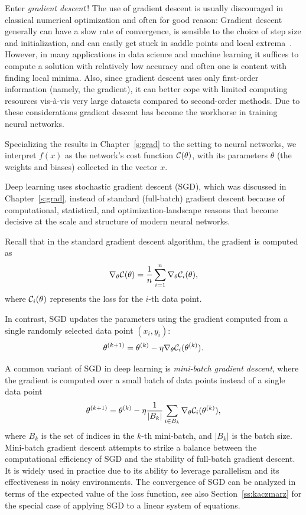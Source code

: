 Enter {\em gradient descent}\,!
The use of gradient descent is usually discouraged in classical numerical optimization and often for good reason: Gradient descent generally can have a slow rate of convergence, is sensible to the choice of step size and initialization, and can easily get stuck in saddle points and local extrema~\cite{nocedal2006numerical}. However, in many applications in data science and machine learning it suffices to compute a solution with relatively low accuracy and often one is content with finding local minima. Also, since gradient descent uses only first-order information (namely, the gradient), it can better cope with limited computing resources vis-{\`a}-vis very large datasets compared to second-order methods. Due to these considerations gradient descent has become the workhorse in training neural networks.


Specializing the results in Chapter~\ref{s:grad} to the setting to neural networks, we interpret $f(x)$ as the network's cost function ${\mathcal C}(\theta)$, with its parameters $\theta$ (the weights and biases) collected in the vector $x$.




Deep learning uses stochastic gradient descent (SGD), which was discussed in Chapter~\ref{s:grad}, instead of standard (full-batch) gradient descent because of computational, statistical, and optimization-landscape reasons that become decisive at the scale and structure of modern neural networks.



Recall that in the standard gradient descent algorithm, the gradient is computed as
$$
\nabla_\theta {\mathcal C}(\theta) = \frac{1}{n} \sum_{i=1}^{n} \nabla_\theta {\mathcal C}_i(\theta),
$$
where ${\mathcal C}_i(\theta)$ represents the loss for the $ i $-th data point.

In contrast, SGD updates the parameters using the gradient computed from a single randomly selected data point $ (x_i, y_i) $:
$$
\theta^{(k+1)} = \theta^{(k)} - \eta \nabla_\theta {\mathcal C}_i(\theta^{(k)}).
$$


A common variant of SGD in deep learning is {\em mini-batch gradient descent}, where the gradient is computed over a small batch of data points instead of a single data point
$$
\theta^{(k+1)} = \theta^{(k)} - \eta \frac{1}{|B_k|} \sum_{i \in B_k} \nabla_\theta {\mathcal C}_i(\theta^{(k)}),
$$
where $ B_k $ is the set of indices in the $ k $-th mini-batch, and $ |B_k| $ is the batch size. Mini-batch gradient descent  attempts to strike a balance between the computational efficiency of SGD and the stability of full-batch gradient descent. It is widely used in practice due to its ability to leverage parallelism and its effectiveness in noisy environments.
The convergence of SGD can be analyzed in terms of the expected value of the loss function, see also Section~\ref{ss:kaczmarz} for the special case of applying SGD to a linear system of equations.



